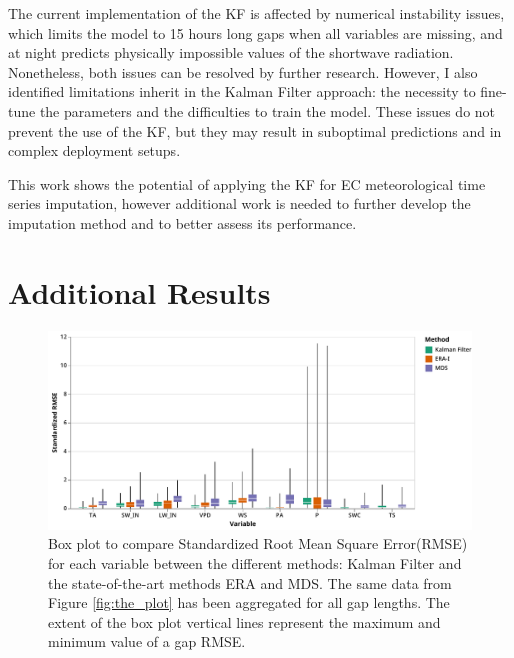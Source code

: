 \documentclass{article}
\newcommand{\imgwidth}{6in}
\let\Oldsection\section
\renewcommand{\section}{\FloatBarrier\Oldsection}
\let\Oldsubsection\subsection
\renewcommand{\subsection}{\FloatBarrier\Oldsubsection}
\begin{document}
The current implementation of the KF is affected by numerical instability issues, which limits the model to  15 hours long gaps when all variables are missing, and at night predicts physically impossible values of the shortwave radiation. Nonetheless, both issues can be resolved by further research. However, I also identified limitations inherit in the Kalman Filter approach: the necessity to fine-tune the parameters and the difficulties to train the model. These issues do not prevent the use of the KF, but they may result in suboptimal predictions and in complex deployment setups.

This work shows the potential of applying the KF for EC meteorological time series imputation, however additional work is needed to further develop the imputation method and to better assess its performance. 

\printbibliography

\pagebreak

\appendix

\renewcommand\thefigure{\thesection.\arabic{figure}}
\renewcommand\thetable{\thesection.\arabic{table}}
\renewcommand\theequation{\thesection.\arabic{equation}}

\FloatBarrier

\section{Additional Results}

\setcounter{figure}{0}
\setcounter{table}{0}


\begin{figure}[H]
    \centerline{\includegraphics[width=\imgwidth]{the_plot_stand}}
\caption{Box plot to compare Standardized Root Mean Square Error(RMSE) for each variable between the different methods: Kalman Filter and the state-of-the-art methods ERA and MDS. The same data from Figure \ref{fig:the_plot} has been aggregated for all gap lengths. The extent of the box plot vertical lines represent the maximum and minimum value of a gap RMSE.}
\label{fig:the_plot_stand}
\end{figure}
\end{document}
